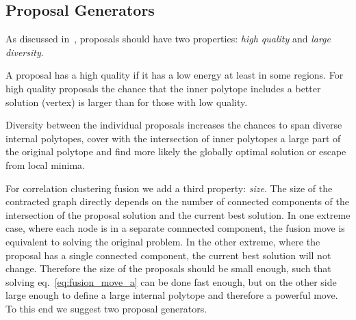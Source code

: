 \documentclass[10pt,twocolumn,letterpaper]{article}
\newtheorem{remark}{Remark}
\theoremstyle{definition}
\newcommand{\OR}{\textrm{ or }}
\begin{document}




\subsection{Proposal Generators}

As discussed in~\cite{Lempitsky-2010}, proposals
should have two properties: \emph{high quality} 
and \emph{large diversity}.

A proposal has a high quality if  it has a low energy at least in some regions.
For high quality proposals the chance that the inner polytope includes a
better solution (vertex) is larger than for those with low quality.

Diversity between the individual proposals increases the chances
to span diverse internal polytopes, cover with the intersection of
inner polytopes a large part of the original polytope and find 
more likely the globally optimal solution or escape from local minima.

For correlation clustering fusion we add a third
property: \emph{size}.
The size of the contracted graph directly
depends on the number of connected components
of the intersection of the proposal solution and the current best solution.
%
In one extreme case, where each 
node is in a separate connnected component,
the fusion move is equivalent to solving the original problem.
In the other extreme, where the proposal has 
a single connected component, the current best solution will not change.
% 
Therefore the size of the proposals
should be small enough, such that solving
eq.~\ref{eq:fusion_move_a} can
be done fast enough, but  on the other side 
large enough to define a large internal polytope and therefore a powerful move.
%
To this end we suggest two proposal generators.
\end{document}
